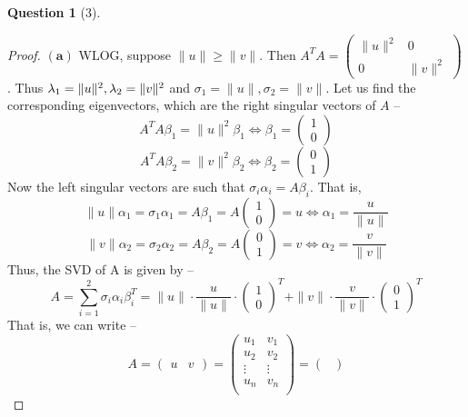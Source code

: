 \documentclass[11pt]{article}
\theoremstyle{quest}
\newtheorem*{question}{Question}
\begin{document}
\begin{question}[3]
\end{question}
\begin{proof}
$\mathbf{(a)}$ WLOG, suppose $\|u\| \ge \|v\|$. Then $A^TA = \begin{pmatrix}
\|u\|^2 & 0 \\
0 & \|v\|^2
\end{pmatrix}$. Thus $\\ \lambda_1 = \|u\|^2, \lambda_2 = \|v\|^2$ and $\sigma_1 = \|u\|, \sigma_2 = \|v\|$. Let us find the corresponding eigenvectors, which are the right singular vectors of $A$ --
$$A^TA \beta_1 = \|u\|^2 \beta_1 \iff \beta_1 = \begin{pmatrix}
1 \\
0
\end{pmatrix} $$
$$A^TA \beta_2 = \|v\|^2 \beta_2 \iff \beta_2 = \begin{pmatrix}
0 \\
1
\end{pmatrix}$$
Now the left singular vectors are such that $\sigma_i \alpha_i = A \beta_i$. That is,
$$\|u\| \alpha_1 = \sigma_1 \alpha_1 = A \beta_1 = A \begin{pmatrix}
1 \\
0
\end{pmatrix} = u \iff \alpha_1 = \dfrac{u}{\|u\|}$$
$$\|v\| \alpha_2 = \sigma_2 \alpha_2 = A \beta_2 = A \begin{pmatrix}
0 \\
1
\end{pmatrix} = v \iff \alpha_2 = \dfrac{v}{\|v\|}$$
Thus, the SVD of A is given by --
$$A = \sum_{i=1}^2 \sigma_i \alpha_i \beta_i^T = \|u\| \cdot \dfrac{u}{\|u\|} \cdot \begin{pmatrix}
1 \\
0
\end{pmatrix}^T + \|v\| \cdot \dfrac{v}{\|v\|} \cdot \begin{pmatrix}
0 \\
1
\end{pmatrix}^T$$
That is, we can write --
$$A = \begin{pmatrix}
u & v
\end{pmatrix} = \begin{pmatrix}
u_1 & v_1 \\
u_2 & v_2 \\
\vdots & \vdots \\
u_n & v_n \\
\end{pmatrix} = \begin{pmatrix}

\end{pmatrix}$$
\end{proof}
\end{document}
